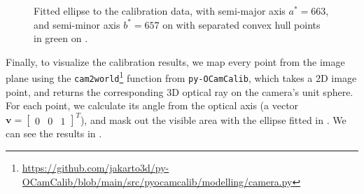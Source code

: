 \begin{figure}[H]
	\centering
	\caption{
		Fitted ellipse to the calibration data, with semi-major axis $a^* = 663$, and semi-minor axis $b^* = 657$
        on  with separated convex hull points in green on .
  }
	\label{fig:ellipse_fit}
\end{figure}

Finally, to visualize the calibration results, we map every point from the image plane using the \texttt{cam2world}\footnote{\url{https://github.com/jakarto3d/py-OCamCalib/blob/main/src/pyocamcalib/modelling/camera.py}}
function from \texttt{py-OCamCalib}, which takes a 2D image point, and returns
the corresponding 3D optical ray on the camera's unit sphere. For each point, we calculate its angle from the optical axis (a vector $\mathbf{v} = \begin{bmatrix} 0 & 0 & 1 \end{bmatrix}^{T}$),
and mask out the visible area with the ellipse fitted in . We can see the results in .

